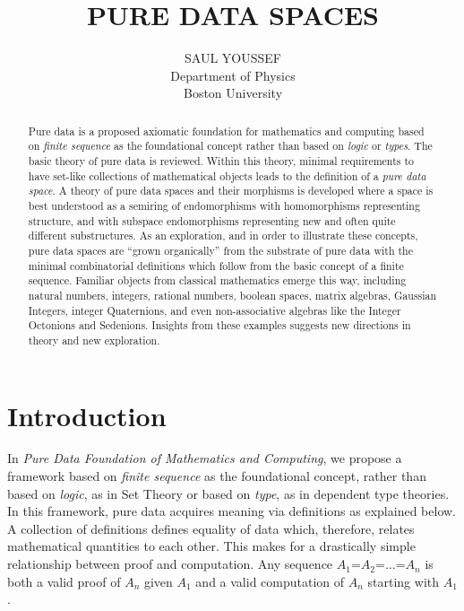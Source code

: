 \documentclass[11pt]{article}
\begin{document}
\title{\bf {PURE DATA SPACES}}
\author{%
  SAUL YOUSSEF%
  \hfil \\
  Department of Physics \\
  Boston University \\
}
\maketitle
\begin{abstract}
Pure data is a proposed axiomatic foundation for mathematics and computing based on {\it finite sequence} as 
the foundational concept rather than based on {\it logic} or {\it types}.  The basic theory of pure data is reviewed.  
Within this theory, minimal requirements to have set-like collections of mathematical objects leads to the definition 
of a {\it pure data space}.  A theory of pure data spaces and their morphisms is developed where a space is best 
understood as a semiring of endomorphisms with homomorphisms representing structure, and with subspace 
endomorphisms representing new and often quite different substructures.  
As an exploration, and in order to illustrate these concepts, pure data spaces are 
``grown organically'' from the substrate of pure data with the minimal combinatorial definitions which follow from 
the basic concept of a finite sequence.  Familiar objects from classical mathematics emerge this way,   
including natural numbers, integers, rational numbers, boolean spaces, matrix algebras, Gaussian Integers, 
integer Quaternions, and even non-associative algebras like the Integer Octonions and Sedenions.  
Insights from these examples suggests new directions in theory and new exploration. 
\end{abstract}

\theoremstyle{definition}
\newtheorem{axiom}{Axiom}
\newtheorem*{axiom*}{Axiom}
\newtheorem*{fact}{Fact}
\newtheorem{theorem}{Theorem}[section]
\newtheorem{lemma}{Lemma}
\newtheorem{corollary}[theorem]{Corollary}

\newtheorem{definition}{Definition}

\newtheorem*{remark}{}

\section{Introduction}

    In {\it Pure Data Foundation of Mathematics and Computing}\cite{PDF}, we propose a framework based on {\it finite sequence} as the foundational concept, rather than based on {\it logic}, as in Set Theory or 
based on {\it type}, as in dependent type theories.  In this framework, pure data acquires meaning via definitions as 
explained below.  A collection of definitions defines equality of data which, therefore, relates mathematical quantities to 
each other.  This makes for a drastically simple relationship between proof and computation.   
Any sequence $A_1$=$A_2$=$\dots$=$A_n$ is both a valid proof of $A_n$ given $A_1$ and a valid computation 
of $A_n$ starting with $A_1$.  
\end{document}
